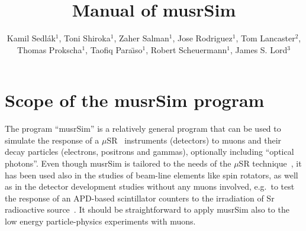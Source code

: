 \documentclass[twoside]{dis04}
\begin{document}
\newcommand{\musr}{\ensuremath{\mu}SR}

\title{Manual of musrSim}

\author{Kamil Sedl\'ak$^1$, Toni Shiroka$^1$, Zaher Salman$^1$, Jose Rodriguez$^1$, Tom Lancaster$^2$, Thomas Prokscha$^1$, Taofiq Para\"{\i}so$^1$, Robert Scheuermann$^1$, James S. Lord$^3$}

\address{{$^1$ Laboratory for Muon Spin Spectroscopy, Paul Scherrer Institut, CH-5232 Villigen PSI, Switzerland}\\
$^2$ Clarendon Laboratory, Department of Physics, Oxford University, Parks Road, Oxford OX1 3PU, UK\\
$^3$ ISIS Facility, Rutherford Appleton Laboratory, Chilton, Oxon OX11 0QX, U.K.}

\maketitle


\section{Scope of the musrSim program}
The program ``musrSim'' is a relatively general program that can be used to simulate 
the response of a $\mu$SR~\cite{Blundel:1999} instruments (detectors) to muons and their decay particles 
(electrons, positrons and gammas), optionally including ``optical photons''.
Even though musrSim is tailored to the needs of 
the $\mu$SR technique~\cite{shirokaGeant}, it has been used also 
in the studies of beam-line elements like spin rotators, as well as
in the detector development
studies without any muons involved, e.g.\ to test the response of an APD-based 
scintillator counters to the irradiation of Sr radioactive source~\cite{FirstExperience}.
It should be straightforward to apply musrSim also to the low energy particle-physics
experiments with muons.
\end{document}
